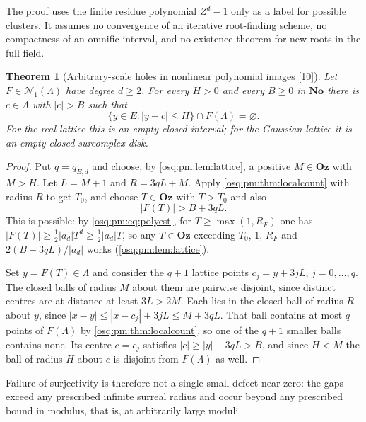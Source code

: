 \documentclass[11pt,letterpaper]{article}
\numberwithin{equation}{section}
\newtheorem{theorem}{Theorem}[section]
\theoremstyle{definition}
\theoremstyle{remark}
\theoremstyle{plain}
\newcommand{\No}{\mathbf{No}}
\newcommand{\Oz}{\mathbf{Oz}}
\newcommand{\Num}{\mathscr N}
\newcommand{\src}[1]{\textup{\textsf{[#1]}}}
\begin{document}
The proof uses the finite residue polynomial $Z^d-1$ only as a label for possible clusters.
It assumes no convergence of an iterative root-finding scheme, no compactness of an
omnific interval, and no existence theorem for new roots in the full field.

\begin{theorem}[Arbitrary-scale holes in nonlinear polynomial images \src{10}]
\label{osq:pm:thm:holes}
Let $F\in\Num_1(\Lambda)$ have degree $d\ge2$. For every $H>0$ and every $B\ge0$ in $\No$
there is $c\in\Lambda$ with $|c|>B$ such that
\begin{equation}\label{osq:pm:eq:hole}
 \{y\in E:|y-c|\le H\}\cap F(\Lambda)=\varnothing .
\end{equation}
For the real lattice this is an empty closed interval; for the Gaussian lattice it is an
empty closed surcomplex disk.
\end{theorem}
\begin{proof}
Put $q=q_{E,d}$ and choose, by \cref{osq:pm:lem:lattice}, a positive $M\in\Oz$ with $M>H$.
Let $L=M+1$ and $R=3qL+M$. Apply \cref{osq:pm:thm:localcount} with radius $R$ to get
$T_0$, and choose $T\in\Oz$ with $T>T_0$ and also
\[
 |F(T)|>B+3qL .
\]
This is possible: by \eqref{osq:pm:eq:polyest}, for $T\ge\max(1,R_F)$ one has
$|F(T)|\ge\frac12|a_d|T^d\ge\frac12|a_d|T$, so any $T\in\Oz$ exceeding $T_0$, $1$, $R_F$
and $2(B+3qL)/|a_d|$ works (\cref{osq:pm:lem:lattice}).

Set $y=F(T)\in\Lambda$ and consider the $q+1$ lattice points $c_j=y+3jL$,
$j=0,\dots,q$. The closed balls of radius $M$ about them are pairwise disjoint, since
distinct centres are at distance at least $3L>2M$. Each lies in the closed ball of radius
$R$ about $y$, since $|x-y|\le|x-c_j|+3jL\le M+3qL$. That ball contains at most $q$ points
of $F(\Lambda)$ by \cref{osq:pm:thm:localcount}, so one of the $q+1$ smaller balls
contains none. Its centre $c=c_j$ satisfies $|c|\ge|y|-3qL>B$, and since $H<M$ the ball
of radius $H$ about $c$ is disjoint from $F(\Lambda)$ as well.
\end{proof}

Failure of surjectivity is therefore not a single small defect near zero: the gaps exceed
any prescribed infinite surreal radius and occur beyond any prescribed bound in modulus,
that is, at arbitrarily large moduli.
\end{document}
